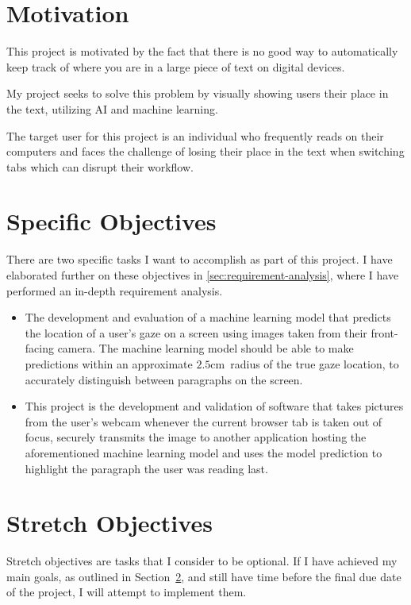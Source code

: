 \documentclass{report}
\begin{document}
\section{Motivation}

This project is motivated by the fact that there is no good way to automatically keep track of where you are in a large piece of text on digital devices.

My project seeks to solve this problem by visually showing users their place in the text, utilizing AI and machine learning.

The target user for this project is an individual who frequently reads on their computers and faces the challenge of losing their place in the text when switching tabs which can disrupt their workflow.

\section{Specific Objectives}\label{sec:specific-objectives}

There are two specific tasks I want to accomplish as part of this project. I have elaborated further on these objectives in \autoref{sec:requirement-analysis}, where I have performed an in-depth requirement analysis. 

\begin{itemize}
    \item The development and evaluation of a machine learning model that predicts the location of a user's gaze on a screen using images taken from their front-facing camera. The machine learning model should be able to make predictions within an approximate \(2.5\text{cm}\)~radius of the true gaze location, to accurately distinguish between paragraphs on the screen.
    \item This project is the development and validation of software that takes pictures from the user's webcam whenever the current browser tab is taken out of focus, securely transmits the image to another application hosting the aforementioned machine learning model and uses the model prediction to highlight the paragraph the user was reading last.
\end{itemize}

\section{Stretch Objectives}\label{sec:stretch-objectives}

Stretch objectives are tasks that I consider to be optional. If I have achieved my main goals, as outlined in Section~\ref{sec:specific-objectives}, and still have time before the final due date of the project, I will attempt to implement them.
\end{document}
